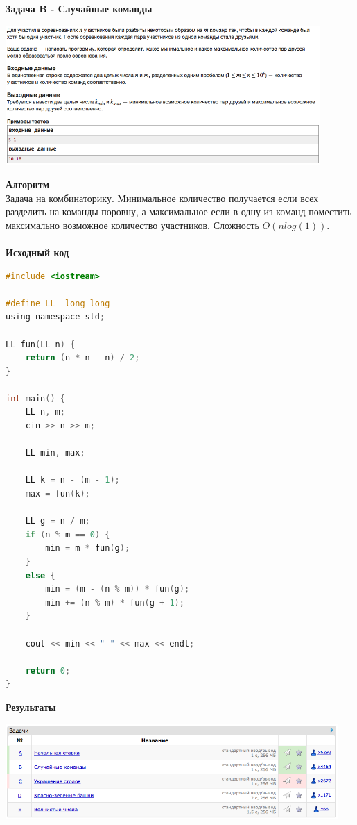 \documentclass[a4paper,12pt]{article}
\begin{document}
\newpage
\textbf{{\large Задача B - Случайные команды}} \\
\begin{center}
\includegraphics[width=0.9\textwidth]{C_273/C_273_B.png}\\ [1cm]
\end{center}
\textbf{{\large Алгоритм}} \\
Задача на комбинаторику. Минимальное количество получается если всех разделить на команды поровну, а максимальное если в одну из команд поместить максимально возможное количество участников. Сложность $O(nlog(1))$.\\ 
\\
\textbf{{\large Исходный код}}
\begin{lstlisting}[language=C]
#include <iostream>

#define LL  long long
using namespace std;

LL fun(LL n) {
    return (n * n - n) / 2;
}

int main() {
    LL n, m;
    cin >> n >> m;
    
    LL min, max;
    
    LL k = n - (m - 1);
    max = fun(k);
    
    LL g = n / m;
    if (n % m == 0) {
        min = m * fun(g);
    }
    else {
        min = (m - (n % m)) * fun(g);
        min += (n % m) * fun(g + 1);
    }
    
    cout << min << " " << max << endl;
    
    return 0;
}
\end{lstlisting}

\textbf{{\large Результаты}} \\
\begin{center}
\includegraphics[width=0.95\textwidth]{C_273/C_273_result.png}\\ [1cm]
\end{center}
\end{document}
